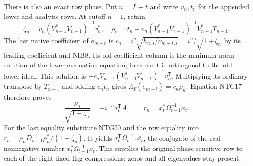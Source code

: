 There is also an exact row phase. Put $n=L+t$ and write
$v_n,t_n$ for the appended lower and analytic rows. At
cutoff $n-1$, retain
\[
 \zeta_n=v_n(V_{n-1}^*V_{n-1})^{-1}v_n^*,\quad
 \rho_n=t_n-v_n(V_{n-1}^*V_{n-1})^{-1}V_{n-1}^*T_{n-1}.
                                                               \tag{NTG21}
\]
The last native coefficient of $e_{m+t}$ is
$c_n=i^n\sqrt{h_{n,s}/\nu_{m+t,s}^-}
     =i^n/\sqrt{1+\zeta_n}$ by its leading coefficient
and NIB8. Its old coefficient column is the minimum-norm
solution of the lower evaluation equation, because it is
orthogonal to the old lower ideal. This solution is
$-c_n\overline{V_{n-1}}(V_{n-1}^{\mathsf T}
\overline{V_{n-1}})^{-1}v_n^{\mathsf T}$.
Multiplying its ordinary transpose by $T_{n-1}$ and adding
$c_nt_n$ gives
$\Lambda_F(e_{m+t})=c_n\rho_n$. Equation NTG17 therefore
proves
\[
 \boxed{\quad
 \frac{\rho_n}{\sqrt{1+\zeta_n}}
        =-i^{-n}x_t^{\mathsf T}A,\qquad
 r_n=x_t^*\Omega_{t-1}^{-1}x_t .
 \quad}                                                        \tag{NTG22}
\]
For the last equality substitute NTG20 and the row equality
into $r_n=\rho_nD_{n-1}^{-1}\rho_n^*/(1+\zeta_n)$.
It yields $x_t^{\mathsf T}\overline{\Omega_{t-1}^{-1}}
\overline{x_t}$, the conjugate of the real nonnegative
number $x_t^*\Omega_{t-1}^{-1}x_t$. This supplies the
original phase-sensitive row to each of the eight fixed
flag compressions; zeros and all eigenvalues stay present.

